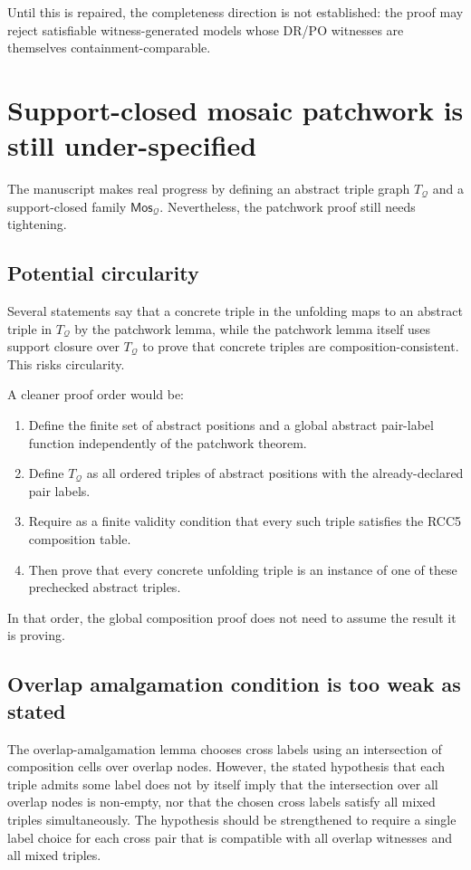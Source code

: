 \documentclass[11pt]{article}
\newcommand{\Mos}{\mathsf{Mos}}
\newcommand{\Q}{\mathcal Q}
\begin{document}
Until this is repaired, the completeness direction is not established: the proof may reject satisfiable witness-generated models whose DR/PO witnesses are themselves containment-comparable.

\section{Support-closed mosaic patchwork is still under-specified}

The manuscript makes real progress by defining an abstract triple graph $T_{\Q}$ and a support-closed family $\Mos_{\Q}$.  Nevertheless, the patchwork proof still needs tightening.

\subsection{Potential circularity}

Several statements say that a concrete triple in the unfolding maps to an abstract triple in $T_{\Q}$ by the patchwork lemma, while the patchwork lemma itself uses support closure over $T_{\Q}$ to prove that concrete triples are composition-consistent.  This risks circularity.

A cleaner proof order would be:
\begin{enumerate}[leftmargin=2em]
  \item Define the finite set of abstract positions and a global abstract pair-label function independently of the patchwork theorem.
  \item Define $T_{\Q}$ as all ordered triples of abstract positions with the already-declared pair labels.
  \item Require as a finite validity condition that every such triple satisfies the RCC5 composition table.
  \item Then prove that every concrete unfolding triple is an instance of one of these prechecked abstract triples.
\end{enumerate}
In that order, the global composition proof does not need to assume the result it is proving.

\subsection{Overlap amalgamation condition is too weak as stated}

The overlap-amalgamation lemma chooses cross labels using an intersection of composition cells over overlap nodes.  However, the stated hypothesis that each triple admits some label does not by itself imply that the intersection over all overlap nodes is non-empty, nor that the chosen cross labels satisfy all mixed triples simultaneously.  The hypothesis should be strengthened to require a single label choice for each cross pair that is compatible with all overlap witnesses and all mixed triples.
\end{document}
